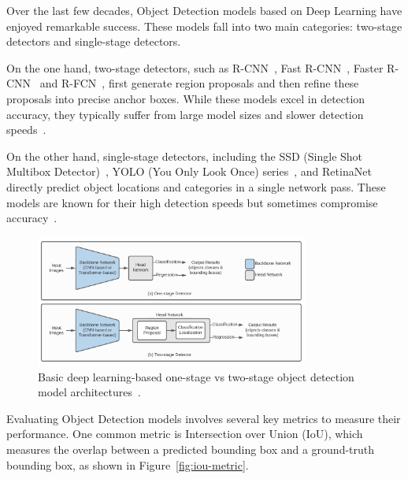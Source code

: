 \documentclass[12pt,oneside]{book} %
\begin{document}
Over the last few decades, Object Detection models based on Deep Learning have
enjoyed remarkable success. These models fall into two main categories:
two-stage detectors and single-stage detectors. 

On the one hand, two-stage detectors, such as
R-CNN~\cite{DBLP:journals/corr/GirshickDDM13}, Fast
R-CNN~\cite{DBLP:journals/corr/Girshick15}, Faster R-CNN~\cite{Ren2017} and
R-FCN~\cite{DBLP:journals/corr/DaiLHS16}, first generate region proposals and
then refine these proposals into precise anchor boxes. While these models excel
in detection accuracy, they typically suffer from large model sizes and slower
detection speeds~\cite{SurveyDLOD, ODNetworkUAVCNNTransformer}.

On the other hand, single-stage detectors, including the SSD (Single Shot
Multibox Detector)~\cite{DBLP:journals/corr/LiuAESR15}, YOLO (You Only Look
Once) series~\cite{DBLP:journals/corr/RedmonDGF15,
    DBLP:journals/corr/RedmonF16, DBLP:journals/corr/abs-2004-10934,
    chen2023yoloms, DBLP:journals/corr/abs-2107-08430, YOLOv5Release, li2023yolov6,
    YOLOv8, wang2024yolov9, xu2022ppyoloe, wang2023goldyolo, xu2023damoyolo,
    wang2024yolov10}, and RetinaNet~\cite{lin2018focal} directly predict object
locations and categories in a single network pass. These models are known for
their high detection speeds but sometimes compromise accuracy~\cite{SurveyDLOD,
    ODNetworkUAVCNNTransformer}.

\begin{figure}[H]
    \centering
    \includegraphics[width=0.8\textwidth]{figures/one-stage_two-stage_OD.png}
    \caption{Basic deep learning-based one-stage vs two-stage object detection model architectures~\cite{SurveyDLOD}.}\label{fig:two-stage-vs-single-stage}
\end{figure}

Evaluating Object Detection models involves several key metrics to measure
their performance. One common metric is Intersection over Union (IoU), which
measures the overlap between a predicted bounding box and a ground-truth
bounding box, as shown in Figure~\ref{fig:iou-metric}.
\end{document}
